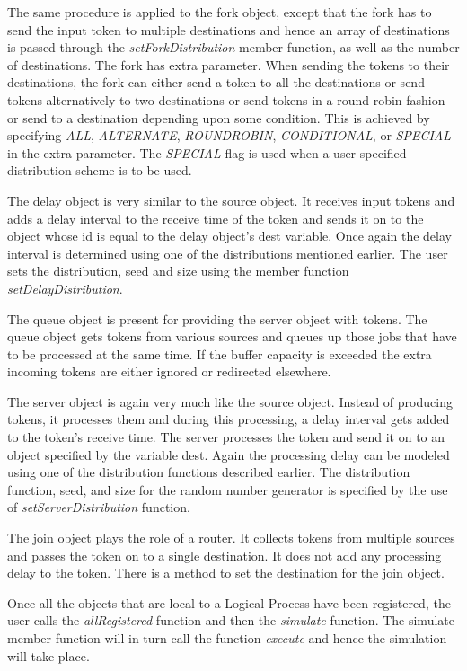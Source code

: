\documentclass[11pt]{report}
\begin{document}
The same procedure is applied to the fork object, except that the fork
has to send the input token to multiple destinations and hence an array
of destinations is passed through the {\it setForkDistribution} member
function, as well as the number of destinations.  The fork has extra
parameter.  When sending the tokens to their destinations, the fork can
either send a token to all the destinations or send tokens alternatively
to two destinations or send tokens in a round robin fashion or send to a
destination depending upon some condition.  This is achieved by
specifying {\it ALL}, {\it ALTERNATE}, {\it ROUNDROBIN},
{\it CONDITIONAL}, or {\it SPECIAL} in the extra parameter.  The
{\it SPECIAL} flag is used when a user specified distribution scheme is
to be used.

The delay object is very similar to the source object.  It receives input
tokens and adds a delay interval to the receive time of the token and
sends it on to the object whose id is equal to the delay object's dest
variable.  Once again the delay interval is determined using one of the
distributions mentioned earlier.  The user sets the distribution, seed and
size using the member function {\it setDelayDistribution}.

The queue object is present for providing the server object with tokens.
The queue object gets tokens from various sources and queues up those
jobs that have to be processed at the same time.  If the buffer capacity
is exceeded the extra incoming tokens are either ignored or redirected
elsewhere.

The server object is again very much like the source object.  Instead of
producing tokens, it processes them and during this processing, a delay
interval gets added to the token's receive time.  The server processes
the token and send it on to an object specified by the variable dest.
Again the processing delay can be modeled using one of the distribution
functions described earlier.  The distribution function, seed, and size
for the random number generator is specified by the use of
{\it setServerDistribution} function.

The join object plays the role of a router.  It collects tokens from
multiple sources and passes the token on to a single destination.  It
does not add any processing delay to the token.  There is a method to
set the destination for the join object.

Once all the objects that are local to a Logical Process have been
registered, the user calls the {\it allRegistered} function and then
the {\it simulate} function.  The simulate member function will in turn
call the function {\it execute} and hence the simulation will take
place.
\end{document}
